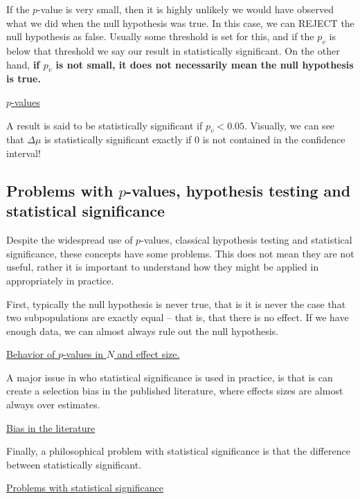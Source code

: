 If the $p$-value is very small, then it is highly unlikely we would have observed what we did when the null hypothesis was true. In this case, we can REJECT the null hypothesis as false. Usually some threshold is set for this, and if the $p_v$ is below that threshold we say our result in statistically significant. On the other hand, {\bf if $p_v$ is not small, it does not necessarily mean the null hypothesis is true.}

\begin{example}
\href{https://colab.research.google.com/drive/143hintE_kXYGkEIphvkUz5ngCdNu22F0#scrollTo=Txol_lYyxXY5}{$p$-values}
\end{example} 

A result is said to be statistically significant if $p_v<0.05$. Visually, we can see that $\Delta \mu$ is statistically significant exactly if $0$ is not contained in the confidence interval! 





\subsection{Problems with $p$-values, hypothesis testing and statistical significance}
Despite the widespread use of $p$-values, classical hypothesis testing and statistical significance, these concepts have some problems. This does not mean they are not useful, rather it is important to understand how they might be applied in appropriately in practice. 

First, typically the null hypothesis is never true, that is it is never the case that two subpopulations are exactly equal -- that is, that there is no effect. If we have enough data, we can almost always rule out the null hypothesis.  

\begin{exercise}
\href{https://colab.research.google.com/drive/1QarJhwPmSqCTQ-HwU_lXCUX6uvdhLdrM#scrollTo=f3odqYsslqkj&line=3&uniqifier=1}{Behavior of $p$-values in $N$ and effect size.  }
\end{exercise} 




A major issue in who statistical significance is used in practice, is that is can create a selection bias in the published literature, where effects sizes are almost always over estimates. 
\begin{exercise}
\href{https://colab.research.google.com/drive/1QarJhwPmSqCTQ-HwU_lXCUX6uvdhLdrM#scrollTo=f3odqYsslqkj&line=3&uniqifier=1}{Bias in the literature }
\end{exercise} 

Finally, a philosophical problem with statistical significance is that the difference between statistically significant. 
\begin{exercise}
\href{https://colab.research.google.com/drive/1QarJhwPmSqCTQ-HwU_lXCUX6uvdhLdrM#scrollTo=f3odqYsslqkj&line=3&uniqifier=1}{Problems with statistical significance }
\end{exercise} 

\